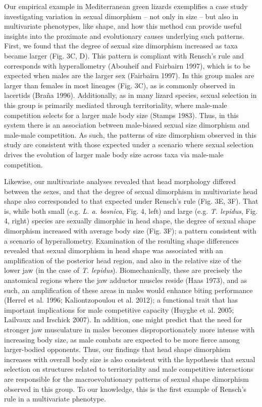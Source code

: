\documentclass[]{article}
\begin{document}
Our empirical example in Mediterranean green lizards exemplifies a case
study investigating variation in sexual dimorphism -- not only in size
-- but also in multivariate phenotypes, like shape, and how this method
can provide useful insights into the proximate and evolutionary causes
underlying such patterns. First, we found that the degree of sexual size
dimorphism increased as taxa became larger (Fig. 3C, D). This pattern is
compliant with Rensch's rule and corresponds with hyperallometry
(Abouheif and Fairbairn 1997), which is to be expected when males are
the larger sex (Fairbairn 1997). In this group males are larger than
females in most lineages (Fig. 3C), as is commonly observed in lacertids
(Braña 1996). Additionally, as in many lizard species, sexual selection
in this group is primarily mediated through territoriality, where
male-male competition selects for a larger male body size (Stamps 1983).
Thus, in this system there is an association between male-biased sexual
size dimorphism and male-male competition. As such, the patterns of size
dimorphism observed in this study are consistent with those expected
under a scenario where sexual selection drives the evolution of larger
male body size across taxa via male-male competition. \hfill\break

Likewise, our multivariate analyses revealed that head morphology
differed between the sexes, and that the degree of sexual dimorphism in
multivariate head shape also corresponded to that expected under
Rensch's rule (Fig. 3E, 3F). That is, while both small (e.g. \emph{L. a.
bosnica}, Fig. 4, left) and large (e.g. \emph{T. lepidus}, Fig. 4,
right) species are sexually dimorphic in head shape, the degree of
sexual shape dimorphism increased with average body size (Fig. 3F); a
pattern consistent with a scenario of hyperallometry. Examination of the
resulting shape differences revealed that sexual dimorphism in head
shape was associated with an amplification of the posterior head region,
and also in the relative size of the lower jaw (in the case of \emph{T.
lepidus}). Biomechanically, these are precisely the anatomical regions
where the jaw adductor muscles reside (Haas 1973), and as such, an
amplification of these areas in males would enhance biting performance
(Herrel et al. 1996; Kaliontzopoulou et al. 2012); a functional trait
that has important implications for male competitive capacity (Huyghe et
al. 2005; Lailvaux and Irschick 2007). In addition, one might predict
that the need for stronger jaw musculature in males becomes
disproportionately more intense with increasing body size, as male
combats are expected to be more fierce among larger-bodied opponents.
Thus, our findings that head shape dimorphism increases with overall
body size is also consistent with the hypothesis that sexual selection
on structures related to territoriality and male competitive
interactions are responsible for the macroevolutionary patterns of
sexual shape dimorphism observed in this group. To our knowledge, this
is the first example of Rensch's rule in a multivariate phenotype.
\hfill\break
\end{document}
